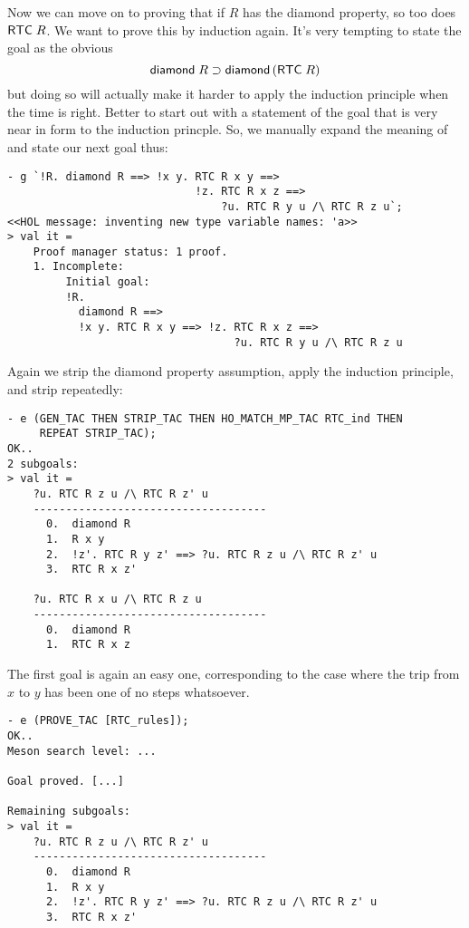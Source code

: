 Now we can move on to proving that if $R$ has the diamond property, so
too does ${\sf RTC}\;R$.  We want to prove this by induction again.
It's very tempting to state the goal as the obvious \[
{\sf diamond}\;R\supset{\sf diamond}\,({\sf RTC}\;R)
\] but doing so will actually make it harder to apply the induction
principle when the time is right.  Better to start out with a
statement of the goal that is very near in form to the induction
princple.  So, we manually expand the meaning of  and state
our next goal thus:
\begin{session}\begin{verbatim}
- g `!R. diamond R ==> !x y. RTC R x y ==>
                             !z. RTC R x z ==>
                                 ?u. RTC R y u /\ RTC R z u`;
<<HOL message: inventing new type variable names: 'a>>
> val it =
    Proof manager status: 1 proof.
    1. Incomplete:
         Initial goal:
         !R.
           diamond R ==>
           !x y. RTC R x y ==> !z. RTC R x z ==>
                                   ?u. RTC R y u /\ RTC R z u
\end{verbatim}\end{session}
    Again we strip the diamond property assumption, apply the
    induction principle, and strip repeatedly:
\begin{session}\begin{verbatim}
- e (GEN_TAC THEN STRIP_TAC THEN HO_MATCH_MP_TAC RTC_ind THEN
     REPEAT STRIP_TAC);
OK..
2 subgoals:
> val it =
    ?u. RTC R z u /\ RTC R z' u
    ------------------------------------
      0.  diamond R
      1.  R x y
      2.  !z'. RTC R y z' ==> ?u. RTC R z u /\ RTC R z' u
      3.  RTC R x z'

    ?u. RTC R x u /\ RTC R z u
    ------------------------------------
      0.  diamond R
      1.  RTC R x z
\end{verbatim}\end{session}
The first goal is again an easy one, corresponding to the case where
the trip from $x$ to $y$ has been one of no steps whatsoever.
\begin{session}\begin{verbatim}
- e (PROVE_TAC [RTC_rules]);
OK..
Meson search level: ...

Goal proved. [...]

Remaining subgoals:
> val it =
    ?u. RTC R z u /\ RTC R z' u
    ------------------------------------
      0.  diamond R
      1.  R x y
      2.  !z'. RTC R y z' ==> ?u. RTC R z u /\ RTC R z' u
      3.  RTC R x z'
\end{verbatim}\end{session}
